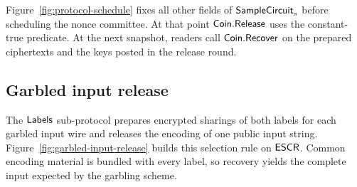 Figure~\ref{fig:protocol-schedule} fixes all other fields of
$\mathsf{SampleCircuit}_s$ before scheduling the nonce committee. At that point
$\mathsf{Coin}.\mathsf{Release}$ uses the constant-true predicate. At the next snapshot,
readers call $\mathsf{Coin}.\mathsf{Recover}$ on the prepared ciphertexts and the keys
posted in the release round.

\subsection{Garbled input release}
\label{sec:garbled-input-release}

The $\mathsf{Labels}$ sub-protocol prepares encrypted sharings of both labels
for each garbled input wire and releases the encoding of one public
input string.  Figure~\ref{fig:garbled-input-release} builds this selection
rule on $\mathsf{ESCR}$.  Common encoding material is bundled with every label,
so recovery yields the complete input expected by the garbling scheme.

